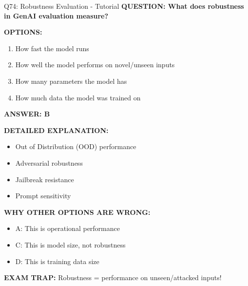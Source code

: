 \documentclass[8pt]{beamer}
\begin{document}
	\begin{frame}{Q74: Robustness Evaluation - Tutorial}
		\fontsize{6.5}{7.5}\selectfont
		\textbf{QUESTION: What does robustness in GenAI evaluation measure?}
		
		\vspace{0.1cm}
		\textbf{OPTIONS:}
		\begin{enumerate}
			\item How fast the model runs
			\item How well the model performs on novel/unseen inputs
			\item How many parameters the model has
			\item How much data the model was trained on
		\end{enumerate}
		
		\vspace{0.1cm}
		\textcolor{myblue}{\textbf{ANSWER: B}}
		
		\vspace{0.1cm}
		\textbf{DETAILED EXPLANATION:}
		\begin{itemize}
			\item Out of Distribution (OOD) performance
			\item Adversarial robustness
			\item Jailbreak resistance
			\item Prompt sensitivity
		\end{itemize}
		
		\vspace{0.1cm}
		\textcolor{myred}{\textbf{WHY OTHER OPTIONS ARE WRONG:}}
		\begin{itemize}
			\item \textcolor{myred}{A:} This is operational performance
			\item \textcolor{myred}{C:} This is model size, not robustness
			\item \textcolor{myred}{D:} This is training data size
		\end{itemize}
		
		\textcolor{myred}{\textbf{EXAM TRAP:}} Robustness = \textcolor{myblue}{performance on unseen/attacked inputs}!
	\end{frame}
	
\end{document}
